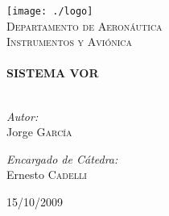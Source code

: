 

\begin{titlepage}

\begin{center}

\texttt{[image: ./logo]}\\[1cm]
\textsc{Departamento de Aeronáutica}\\[1.5cm]
\textsc{\Large Instrumentos y Aviónica }\\[0.5cm]
\HRule \\[0.4cm]
{ \huge \bfseries SISTEMA VOR}\\[0.4cm]
\HRule \\[1.5cm]
\begin{minipage}{0.4\textwidth}
\begin{flushleft} \large
\emph{Autor:}\\
Jorge \textsc{García}
\end{flushleft}
\end{minipage}
\begin{minipage}{0.4\textwidth}
\begin{flushright} \large
\emph{Encargado de Cátedra:} \\
Ernesto \textsc{Cadelli}
\end{flushright}
\end{minipage}
\vfill
{\large 15/10/2009}
\end{center}
\end{titlepage}





